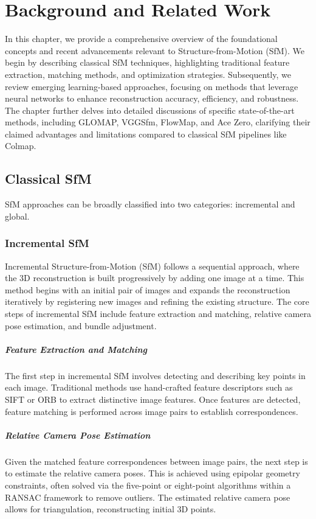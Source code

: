\chapter{Background and Related Work}\label{chap:related_work}

In this chapter, we provide a comprehensive overview of the foundational concepts and recent advancements relevant to Structure-from-Motion (SfM).
We begin by describing classical SfM techniques, highlighting traditional feature extraction, matching methods, and optimization strategies. 
Subsequently, we review emerging learning-based approaches, focusing on methods that leverage neural networks to enhance reconstruction accuracy, efficiency, and robustness. 
The chapter further delves into detailed discussions of specific state-of-the-art methods, including GLOMAP, VGGSfm, FlowMap, and Ace Zero, 
clarifying their claimed advantages and limitations compared to classical SfM pipelines like Colmap.

\section{Classical SfM}
SfM approaches can be broadly classified into two categories: incremental and global.

\subsection{Incremental SfM}
Incremental Structure-from-Motion (SfM) follows a sequential approach, where the 3D reconstruction is built progressively by adding one image at a time. 
This method begins with an initial pair of images and expands the reconstruction iteratively by registering new images and refining the existing structure. 
The core steps of incremental SfM include feature extraction and matching, relative camera pose estimation, and bundle adjustment.

\paragraph{Feature Extraction and Matching}
The first step in incremental SfM involves detecting and describing key points in each image. 
Traditional methods use hand-crafted feature descriptors such as SIFT or ORB to extract distinctive image features. 
Once features are detected, feature matching is performed across image pairs to establish correspondences.

\paragraph{Relative Camera Pose Estimation}
Given the matched feature correspondences between image pairs, the next step is to estimate the relative camera poses. 
This is achieved using epipolar geometry constraints, often solved via the five-point or eight-point algorithms within a RANSAC framework to remove outliers. 
The estimated relative camera pose allows for triangulation, reconstructing initial 3D points.

